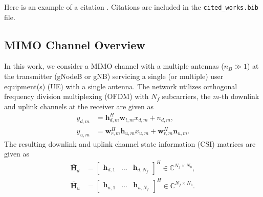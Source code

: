 
Here is an example of a citation \cite{ref:oetiker1995not}. Citations are included in the \texttt{cited\_works.bib} file.

\subsection{MIMO Channel Overview}
\label{sect:mimo_model}

In this work, we consider a MIMO channel with a multiple antennas ($n_B \gg 1$) at the transmitter (gNodeB or gNB) servicing a single (or multiple) user equipment(s) (UE) with a single antenna. The network utilizes orthogonal frequency division multiplexing (OFDM) with $N_f$ subcarriers, the $m$-th downlink and uplink channels at the receiver are given as
\begin{align*}
	y_{d,m} &= \mathbf h_{d,m}^H\mathbf w_{t,m}x_{d,m} + n_{d,m}, \\
	y_{u,m} &= \mathbf w_{r,m}^H\mathbf h_{u,m}x_{u,m} + \mathbf w_{r,m}^H\mathbf n_{u,m}.
\end{align*}
The resulting downlink and uplink channel state information (CSI) matrices are given as
\begin{align*} 
	\bar{\mathbf H}_d &= \begin{bmatrix} \mathbf h_{d,1} & \dots & \mathbf h_{d,N_f}\end{bmatrix}^H \in \mathbb C^{N_f \times N_b}, \\
	\bar{\mathbf H}_u &= \begin{bmatrix} \mathbf h_{u,1} & \dots & \mathbf h_{u,N_f}\end{bmatrix}^H \in \mathbb C^{N_f \times N_b}.
\end{align*}
